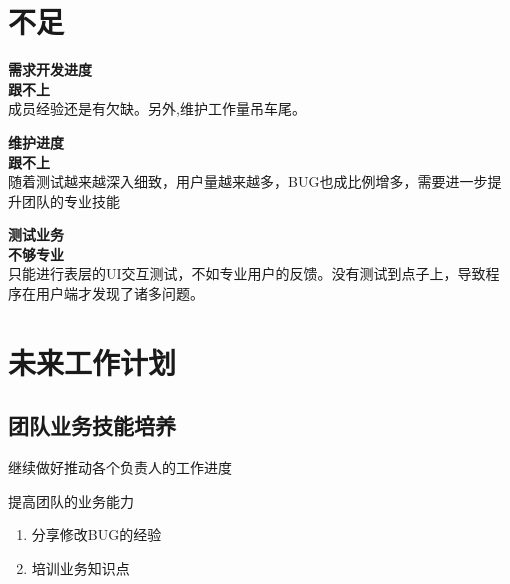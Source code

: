 \documentclass[AutoFakeBold,AutoFakeSlant]{beamer}
\begin{document}
	
	\section{不足}
	\begin{frame}[fragile]
		\large
		
		\begin{minipage}[l]{0.3\linewidth}
			\footnotesize 
			\textbf{\large 需求开发进度\\跟不上}\\
			成员经验还是有欠缺。另外,维护工作量吊车尾。
		\end{minipage}\hfill
		\begin{minipage}[l]{0.3\linewidth}
			\footnotesize 
			\textbf{\large 维护进度\\跟不上}\\
			随着测试越来越深入细致，用户量越来越多，BUG也成比例增多，需要进一步提升团队的专业技能
		\end{minipage}\hfill
		\begin{minipage}[l]{0.3\linewidth}
			\footnotesize 
			\textbf{\large 测试业务\\不够专业}\\
			只能进行表层的UI交互测试，不如专业用户的反馈。没有测试到点子上，导致程序在用户端才发现了诸多问题。
		\end{minipage}
	\end{frame}
	
	\section{未来工作计划}
	\subsection{团队业务技能培养}
	\begin{frame}[fragile]
		\large
		\begin{enumerate}
			\item 继续做好推动各个负责人的工作进度
			{
				\item
				提高团队的业务能力
				\begin{enumerate}
					\item 分享修改BUG的经验
					\item 培训业务知识点
				\end{enumerate}
			} 
		\end{enumerate}
	\end{frame}
	
\end{document}
